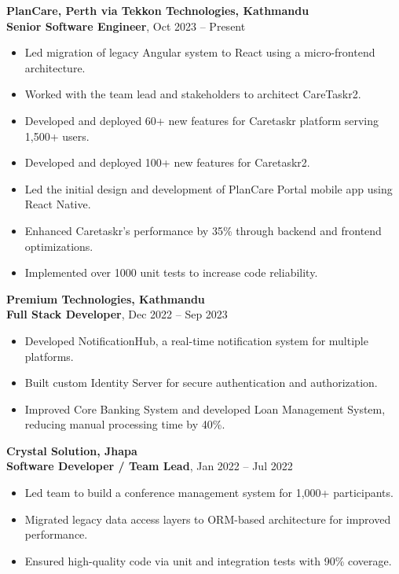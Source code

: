 \textbf{PlanCare, Perth via Tekkon Technologies, Kathmandu}\\
\textbf{Senior Software Engineer}, Oct 2023 -- Present

\begin{itemize}
\tightlist
\item
  Led migration of legacy Angular system to React using a micro-frontend
  architecture.
\item
  Worked with the team lead and stakeholders to architect CareTaskr2.
\item
  Developed and deployed 60+ new features for Caretaskr platform serving
  1,500+ users.
\item
  Developed and deployed 100+ new features for Caretaskr2.
\item
  Led the initial design and development of PlanCare Portal mobile app
  using React Native.
\item
  Enhanced Caretaskr's performance by 35\% through backend and frontend
  optimizations.
\item
  Implemented over 1000 unit tests to increase code reliability.
\end{itemize}

\textbf{Premium Technologies, Kathmandu}\\
\textbf{Full Stack Developer}, Dec 2022 -- Sep 2023

\begin{itemize}
\tightlist
\item
  Developed NotificationHub, a real-time notification system for
  multiple platforms.
\item
  Built custom Identity Server for secure authentication and
  authorization.
\item
  Improved Core Banking System and developed Loan Management System,
  reducing manual processing time by 40\%.
\end{itemize}

\textbf{Crystal Solution, Jhapa}\\
\textbf{Software Developer / Team Lead}, Jan 2022 -- Jul 2022

\begin{itemize}
\tightlist
\item
  Led team to build a conference management system for 1,000+
  participants.
\item
  Migrated legacy data access layers to ORM-based architecture for
  improved performance.
\item
  Ensured high-quality code via unit and integration tests with 90\%
  coverage.
\end{itemize}

